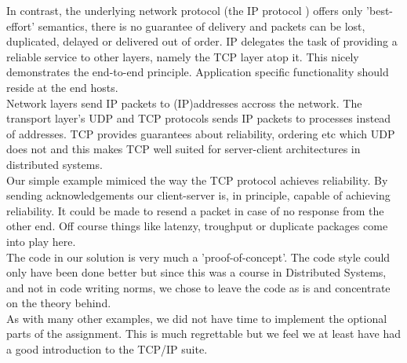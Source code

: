 In contrast, the underlying network protocol (the IP protocol ) offers only 'best-effort' semantics, there is no guarantee of delivery and packets can be lost, duplicated, delayed or delivered out of order. IP delegates the task of providing a reliable service to other layers, namely the TCP layer atop it. This nicely demonstrates the end-to-end principle. Application specific functionality should reside at the end hosts.\\

Network layers send IP packets to (IP)addresses accross the network. The transport layer's UDP and TCP protocols sends IP packets to processes instead of addresses. TCP provides guarantees about reliability, ordering etc which UDP does not and this makes TCP well suited for server-client architectures in distributed systems. \\

Our simple example mimiced the way the TCP protocol achieves reliability. By sending acknowledgements our client-server is, in principle, capable of achieving reliability. It could be made to resend a packet in case of no response from the other end. Off course things like latenzy, troughput or duplicate packages come into play here. \\

The code in our solution is very much a 'proof-of-concept'. The code style could only have been done better but since this was a course in Distributed Systems, and not in code writing norms, we chose to leave the code as is and concentrate on the theory behind.  \\

As with many other examples, we did not have time to implement the optional parts of the assignment. This is much regrettable but we feel we at least have had a good introduction to the TCP/IP suite.

